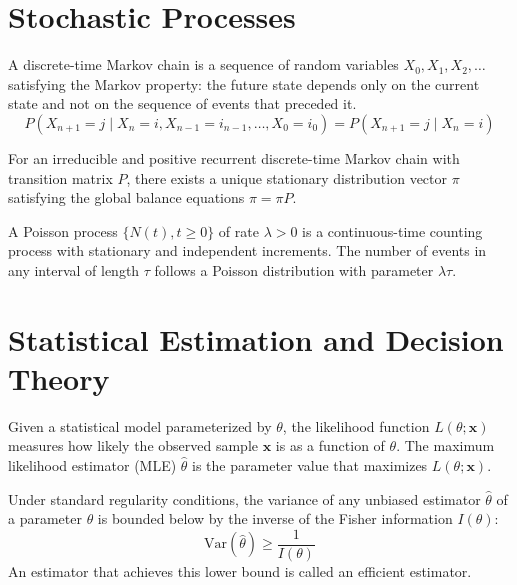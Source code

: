 \section{Stochastic Processes}

\begin{definition}
A discrete-time Markov chain is a sequence of random variables $X_0, X_1, X_2, \ldots$ satisfying the Markov property: the future state depends only on the current state and not on the sequence of events that preceded it.
\[ P(X_{n+1} = j \mid X_n = i, X_{n-1} = i_{n-1}, \ldots, X_0 = i_0) = P(X_{n+1} = j \mid X_n = i) \]
\end{definition}

\begin{theorem}
For an irreducible and positive recurrent discrete-time Markov chain with transition matrix $P$, there exists a unique stationary distribution vector $\pi$ satisfying the global balance equations $\pi = \pi P$.
\end{theorem}

\begin{example}
A Poisson process $\{N(t), t \geq 0\}$ of rate $\lambda > 0$ is a continuous-time counting process with stationary and independent increments. The number of events in any interval of length $\tau$ follows a Poisson distribution with parameter $\lambda \tau$.
\end{example}

\section{Statistical Estimation and Decision Theory}

\begin{definition}
Given a statistical model parameterized by $\theta$, the likelihood function $L(\theta; \mathbf{x})$ measures how likely the observed sample $\mathbf{x}$ is as a function of $\theta$. The maximum likelihood estimator (MLE) $\hat{\theta}$ is the parameter value that maximizes $L(\theta; \mathbf{x})$.
\end{definition}

\begin{theorem}
Under standard regularity conditions, the variance of any unbiased estimator $\hat{\theta}$ of a parameter $\theta$ is bounded below by the inverse of the Fisher information $I(\theta)$:
\[ \text{Var}(\hat{\theta}) \geq \frac{1}{I(\theta)} \]
An estimator that achieves this lower bound is called an efficient estimator.
\end{theorem}

